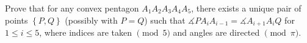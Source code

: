 Prove that for any convex pentagon $A_1A_2A_3A_4A_5$, there exists a unique pair of points $\left\{P,Q\right\}$ (possibly with $P=Q$) such that $\measuredangle{PA_iA_{i-1}}=\measuredangle{A_{i+1}A_iQ}$ for $1\leq i\leq5$, where indices are taken $\pmod5$ and angles are directed $\pmod\pi$.